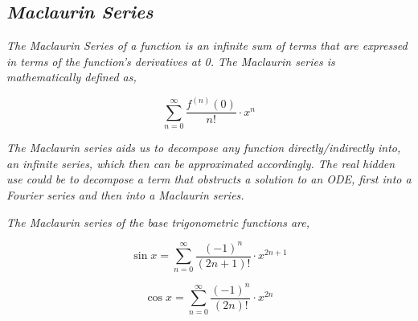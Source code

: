 

\subsection{\textit{Maclaurin Series}}

	\textit{The Maclaurin Series of a function is an infinite sum of terms that are expressed in terms of the function's derivatives at 0. The Maclaurin series is mathematically defined as,}

		$$\sum_{n=0}^{\infty}\frac{f^{(n)}(0)}{n!}\cdot x^n$$

	\textit{The Maclaurin series aids us to decompose any function directly/indirectly into, an infinite series, which then can be approximated accordingly. The real hidden use could be to decompose a term that obstructs a solution to an ODE, first into a Fourier series and then into a Maclaurin series.}

	\textit{The Maclaurin series of the base trigonometric functions are,}

		$$\sin x = \sum_{n=0}^{\infty}\frac{(-1)^n}{(2n+1)!}\cdot x^{2n+1}$$
		
		$$\cos x = \sum_{n=0}^{\infty}\frac{(-1)^n}{(2n)!}\cdot x^{2n}$$		
		


